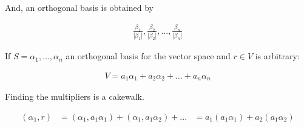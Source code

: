 \begin{enumerate}
  And, an orthogonal basis is obtained by

  \begin{align*}
    {\frac{\beta_1}{|\beta_1|}, \frac{\beta_2}{|\beta_2|}, ..., \frac{\beta_n}{|\beta_n|}}  
  \end{align*}

  If $S = {\alpha_1, ..., \alpha_n}$ an orthogonal basis for the vector space and $r \in V$ is arbitrary:

  \begin{align*}
    V = a_1\alpha_1 + a_2\alpha_2 + ... + a_n\alpha_n
  \end{align*}

  Finding the multipliers is a cakewalk.

  \begin{align*}
    (\alpha_1, r) &= (\alpha_1, a_1\alpha_1) + (\alpha_1, a_1\alpha_2) + ...
                  &= a_1(a_1\alpha_1) + a_2(a_1\alpha_2)
  \end{align*}

 \end{enumerate} 